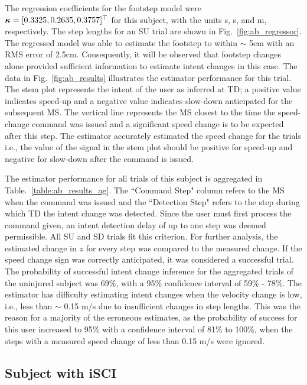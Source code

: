 The regression coefficients for the footstep model were $ \boldsymbol{\kappa} = [0.3325 ,0.2635 ,0.3757]^{\top} $ for this subject, with the units s, s, and m, respectively. The step lengths for an SU trial are shown in Fig.~\ref{fig:ab_regressor}. The regressed model was able to estimate the footstep to within $ \sim $ 5cm with an RMS error of 2.5cm. Consequently, it will be observed that footstep changes alone provided sufficient information to estimate intent changes in this case. The data in Fig.~\ref{fig:ab_results} illustrates the estimator performance for this trial. The stem plot represents the intent of the user as inferred at TD; a positive value indicates speed-up and a negative value indicates slow-down anticipated for the subsequent MS. The vertical line represents the MS closest to the time the speed-change command was issued and a significant speed change is to be expected after this step. The estimator accurately estimated the speed change for the trials i.e., the value of the signal in the stem plot should be positive for speed-up and negative for slow-down after the command is issued.

The estimator performance for all trials of this subject is aggregated in Table.~\ref{table:ab_results_ag}. The ``Command Step" column refers to the MS when the command was issued and the ``Detection Step" refers to the step during which TD the intent change was detected. Since the user must first process the command given, an intent detection delay of up to one step was deemed permissible. All SU and SD trials fit this criterion. 
%
%
%		
For further analysis, the estimated change in $ z $ for every step was compared to the measured change. If the speed change sign was correctly anticipated, it was considered a successful trial. The probability of successful intent change inference for the aggregated trials of the uninjured subject was 69\%, with a 95\% confidence interval \cite{brown2001interval} of 59\% - 78\%. The estimator has difficulty estimating intent changes when the velocity change is low, i.e., less than $ \sim $ 0.15 m/s due to insufficient changes in step lengths. This was the reason for a majority of the erroneous estimates, as the probability of success for this user increased to 95\% with a confidence interval of 81\% to 100\%, when the steps with a measured speed change of less than 0.15 m/s were ignored.


\subsection{Subject with iSCI}\label{sec:nab_results}

